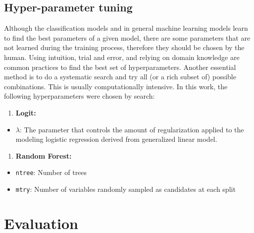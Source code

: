 \documentclass{article}
\providecommand{\tightlist}{%
  \setlength{\itemsep}{0pt}\setlength{\parskip}{0pt}}
\begin{document}
\hypertarget{hyper-parameter-tuning}{%
\subsection{\texorpdfstring{Hyper-parameter tuning
\label{subsec:hyperpar}}{Hyper-parameter tuning }}\label{hyper-parameter-tuning}}

Although the classification models and in general machine learning
models learn to find the best parameters of a given model, there are
some parameters that are not learned during the training process,
therefore they should be chosen by the human. Using intuition, trial and
error, and relying on domain knowledge are common practices to find the
best set of hyperparameters. Another essential method is to do a
systematic search and try all (or a rich subset of) possible
combinations. This is usually computationally intensive. In this work,
the following hyperparameters were chosen by search:

\begin{enumerate}
\def\labelenumi{\arabic{enumi}.}
\tightlist
\item
  \textbf{Logit:}
\end{enumerate}

\begin{itemize}
\tightlist
\item
  \(\lambda\): The parameter that controls the amount of regularization
  applied to the modeling logistic regression derived from generalized
  linear model.
\end{itemize}

\begin{enumerate}
\def\labelenumi{\arabic{enumi}.}
\setcounter{enumi}{1}
\tightlist
\item
  \textbf{Random Forest:}
\end{enumerate}

\begin{itemize}
\tightlist
\item
  \texttt{ntree}: Number of trees
\item
  \texttt{mtry}: Number of variables randomly sampled as candidates at
  each split
\end{itemize}

\hypertarget{evaluation}{%
\section{\texorpdfstring{Evaluation
\label{sec:evaluation}}{Evaluation }}\label{evaluation}}
\end{document}
